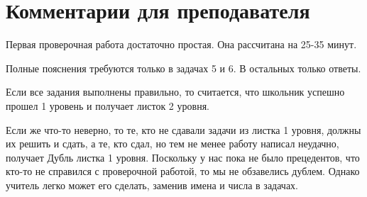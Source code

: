 \section{Комментарии для преподавателя} 

Первая проверочная работа достаточно простая. Она рассчитана на 25-35 минут. 

Полные пояснения требуются только в задачах 5 и 6. В остальных только ответы.

Если все задания выполнены правильно, то считается, что школьник успешно прошел 1 уровень и получает листок 2 уровня.

Если же что-то неверно, то те, кто не сдавали задачи из листка 1 уровня,  должны их решить и сдать, а те, кто сдал, но тем не менее работу написал неудачно, получает Дубль листка 1 уровня. Поскольку у нас пока не было прецедентов, что кто-то не справился с проверочной работой, то мы не обзавелись дублем. Однако учитель легко может его сделать, заменив имена и числа в задачах.


